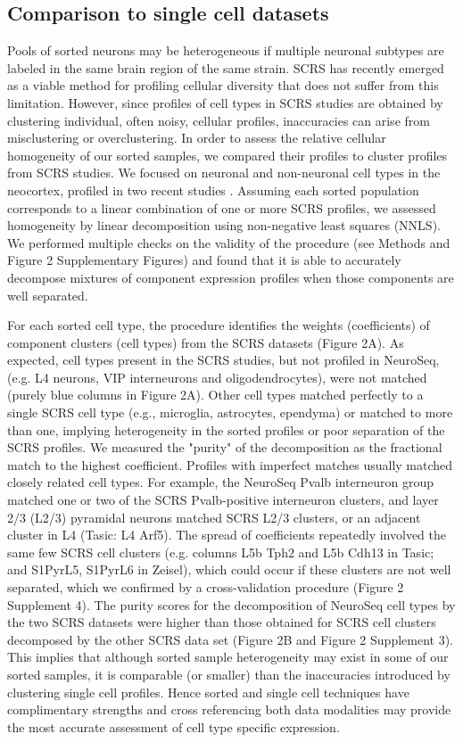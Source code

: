 \subsection{Comparison to single cell datasets}
Pools of sorted neurons may be heterogeneous if multiple neuronal subtypes are labeled in the same brain region of the same strain. SCRS has recently emerged as a viable method for profiling cellular diversity that does not suffer from this limitation. However, since profiles of cell types in SCRS studies are obtained by clustering individual, often noisy, cellular profiles, inaccuracies can arise from misclustering or overclustering. In order to assess the relative cellular homogeneity of our sorted samples, we compared their profiles to cluster profiles from SCRS studies. We focused on neuronal and non-neuronal cell types in the neocortex, profiled in two recent studies \citep{Tasic_2016,Zeisel_2015}. Assuming  each sorted population corresponds to a linear combination of one or more SCRS profiles, we assessed homogeneity by linear decomposition using non-negative least squares (NNLS). We performed multiple checks on the validity of the procedure (see Methods and Figure 2 Supplementary Figures) and found that it is able to accurately decompose mixtures of component expression profiles when those components are well separated. 

For each sorted cell type, the procedure identifies the weights (coefficients) of  component clusters (cell types) from the SCRS datasets (Figure 2A). As expected, cell types present in the SCRS studies, but not profiled in NeuroSeq, (e.g. L4 neurons, VIP interneurons and oligodendrocytes), were not matched (purely blue columns in Figure 2A). Other cell types matched perfectly to a single SCRS cell type (e.g., microglia, astrocytes, ependyma) or matched to more than one, implying heterogeneity in the sorted profiles or poor separation of the SCRS profiles. We measured the "purity" of the decomposition as the fractional match to the highest coefficient. Profiles with imperfect matches usually matched closely related cell types. For example, the NeuroSeq Pvalb interneuron group matched one or two of the SCRS Pvalb-positive interneuron clusters, and layer 2/3 (L2/3) pyramidal neurons matched SCRS L2/3 clusters, or an adjacent cluster in L4 (Tasic: L4 Arf5). The spread of coefficients repeatedly involved the same few SCRS cell clusters (e.g. columns L5b Tph2 and L5b Cdh13 in Tasic; and S1PyrL5,  S1PyrL6 in Zeisel), which could occur if these clusters are not well separated, which we confirmed by a cross-validation procedure (Figure 2 Supplement 4). The purity scores for the decomposition of NeuroSeq cell types by the two SCRS datasets were higher than those obtained for SCRS cell clusters decomposed by the other SCRS data set (Figure 2B and Figure 2 Supplement 3). This implies that although sorted sample heterogeneity may exist in some of our sorted samples, it is comparable (or smaller) than the inaccuracies introduced by clustering single cell profiles. Hence sorted and single cell techniques have complimentary strengths and cross referencing both data modalities may provide the most accurate assessment of cell type specific expression. 



